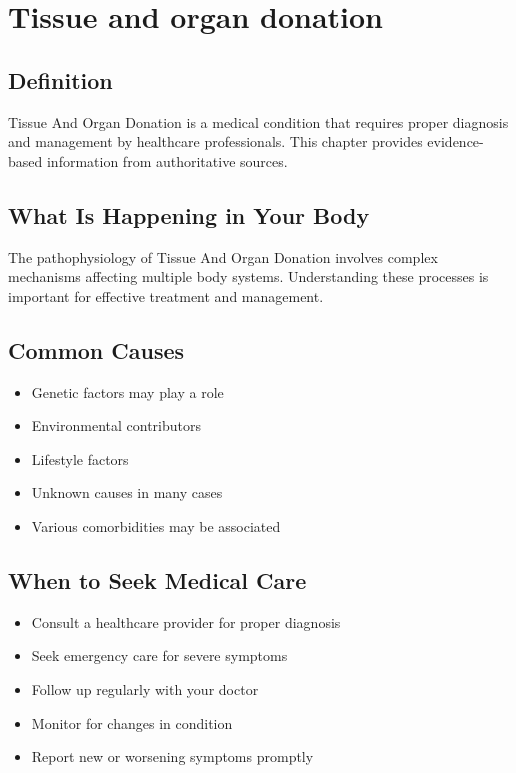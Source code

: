 
\chapter{Tissue and organ donation}

\section*{Definition}
Tissue And Organ Donation is a medical condition that requires proper diagnosis and management by healthcare professionals. This chapter provides evidence-based information from authoritative sources.

\section*{What Is Happening in Your Body}
The pathophysiology of Tissue And Organ Donation involves complex mechanisms affecting multiple body systems. Understanding these processes is important for effective treatment and management.

\section*{Common Causes}
\begin{itemize}
  \item Genetic factors may play a role
  \item Environmental contributors
  \item Lifestyle factors
  \item Unknown causes in many cases
  \item Various comorbidities may be associated
\end{itemize}

\section*{When to Seek Medical Care}
\begin{itemize}
  \item Consult a healthcare provider for proper diagnosis
  \item Seek emergency care for severe symptoms
  \item Follow up regularly with your doctor
  \item Monitor for changes in condition
  \item Report new or worsening symptoms promptly
\end{itemize}

